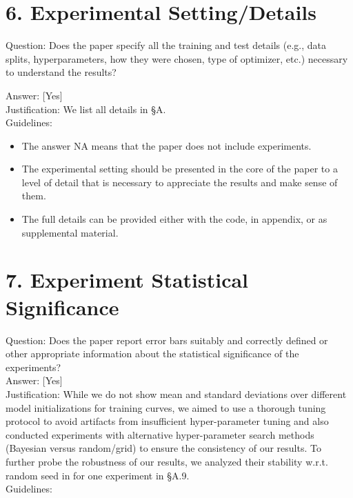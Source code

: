 \documentclass[10pt]{article}
\begin{document}
\section*{6. Experimental Setting/Details}
Question: Does the paper specify all the training and test details (e.g., data splits, hyperparameters, how they were chosen, type of optimizer, etc.) necessary to understand the results?

Answer: [Yes]\\
Justification: We list all details in §A.\\
Guidelines:

\begin{itemize}
  \item The answer NA means that the paper does not include experiments.
  \item The experimental setting should be presented in the core of the paper to a level of detail that is necessary to appreciate the results and make sense of them.
  \item The full details can be provided either with the code, in appendix, or as supplemental material.
\end{itemize}

\section*{7. Experiment Statistical Significance}
Question: Does the paper report error bars suitably and correctly defined or other appropriate information about the statistical significance of the experiments?\\[0pt]
Answer: [Yes]\\
Justification: While we do not show mean and standard deviations over different model initializations for training curves, we aimed to use a thorough tuning protocol to avoid artifacts from insufficient hyper-parameter tuning and also conducted experiments with alternative hyper-parameter search methods (Bayesian versus random/grid) to ensure the consistency of our results. To further probe the robustness of our results, we analyzed their stability w.r.t. random seed in for one experiment in §A.9.\\
Guidelines:
\end{document}
